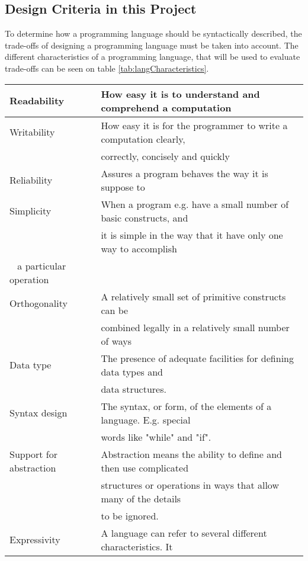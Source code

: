 \subsection{Design Criteria in this Project}
To determine how a programming language should be syntactically described, the trade-offs of designing a programming language must be taken into account. The different characteristics of a programming language, that will be used to evaluate trade-offs can be seen on table \ref{tab:langCharacteristics}.
\begin{table}[H]
	\begin{tabular}{|l|l|}
		\hline
		
		Readability				& How easy it is to understand and comprehend a computation 		\\ \hline
		Writability				& How easy it is for the programmer to write a computation clearly, \\
		~ 						& correctly, concisely and quickly 									\\ \hline
		Reliability 			& Assures a program behaves the way it is suppose to				\\ \hline
		Simplicity				& When a program e.g. have a small number of basic constructs, and 	\\
		~						& it is simple in the way that it have only one way to accomplish	\\
		~						a particular operation												\\ \hline
		Orthogonality 			& A relatively small set of primitive constructs can be				\\
		~ 						& combined legally in a relatively small number of ways				\\ \hline	
		Data type				& The presence of adequate facilities for defining data types and 	\\
		~						& data structures.													\\ \hline
		Syntax design			& The syntax, or form, of the elements of a language. E.g. special	\\
		~						& words like "while" and "if".										\\ \hline
		Support for abstraction	& Abstraction means the ability to define and then use complicated	\\
		~						& structures or operations in ways that allow many of the details	\\
		~						& to be ignored.													\\ \hline
		Expressivity			& A language can refer to several different characteristics. It		\\

\end{tabular}
\end{table}
